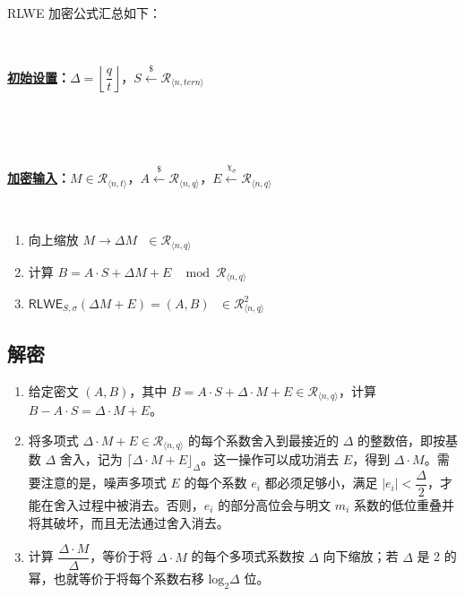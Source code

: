 $ $

RLWE 加密公式汇总如下：

$ $
\begin{tcolorbox}[title={\textbf{\tboxlabel{\ref*{subsec:rlwe-enc}} RLWE 加密}}]
\textbf{\underline{初始设置}：}$\Delta = \left\lfloor\dfrac{q}{t}\right\rfloor$，$S \xleftarrow{\$} \mathcal{R}_{\langle n, \textit{tern} \rangle}$

$ $

$ $

\textbf{\underline{加密输入}：}$M \in \mathcal{R}_{\langle n, t \rangle}$，$A \xleftarrow{\$} \mathcal{R}_{\langle n, q \rangle}$，$E \xleftarrow{\chi_\sigma} \mathcal{R}_{\langle n, q \rangle}$

$ $

\begin{enumerate}
\item 向上缩放 $M \longrightarrow \Delta  M \text{ } \in \mathcal{R}_{\langle n, q \rangle}$
\item 计算 $B = A \cdot S + \Delta  M + E  \text{ } \bmod \mathcal{R}_{\langle n,q \rangle}$
\item $\textsf{RLWE}_{S,\sigma}(\Delta  M + E) = (A, B) \text{ } \in \mathcal{R}_{\langle n,q \rangle}^2$
\end{enumerate}

\end{tcolorbox}

\subsection{解密}
\label{subsec:rlwe-dec}

\begin{enumerate}
\item 给定密文 $(A, B)$，其中 $B = A \cdot S + \Delta \cdot M + E \in \mathcal{R}_{\langle n,q \rangle}$，计算 $B - A \cdot S = \Delta \cdot M + E$。
\item 将多项式 $\Delta \cdot M + E \in \mathcal{R}_{\langle n,q \rangle}$ 的每个系数舍入到最接近的 $\Delta$ 的整数倍，即按基数 $\Delta$ 舍入，记为 $\lceil \Delta \cdot M + E \rfloor_{\Delta}$。这一操作可以成功消去 $E$，得到 $\Delta \cdot M$。需要注意的是，噪声多项式 $E$ 的每个系数 $e_i$ 都必须足够小，满足 $|e_i| < \dfrac{\Delta}{2}$，才能在舍入过程中被消去。否则，$e_i$ 的部分高位会与明文 $m_i$ 系数的低位重叠并将其破坏，而且无法通过舍入消去。
\item 计算 $\dfrac{\Delta \cdot M}{\Delta}$，等价于将 $\Delta \cdot M$ 的每个多项式系数按 $\Delta$ 向下缩放；若 $\Delta$ 是 2 的幂，也就等价于将每个系数右移 $\text{log}_2 \Delta$ 位。
\end{enumerate}


